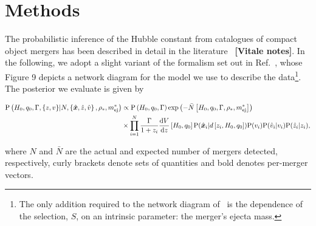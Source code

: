 \documentclass[%
 reprint,
 superscriptaddress,
 nofootinbib,
 amsmath,amssymb,
 aps,
]{revtex4-2}
\newcommand{\hubble}{\ensuremath{H_0}}
\newcommand{\decel}{\ensuremath{q_0}}
\newcommand{\prob}{\ensuremath{{\rm P}}}
\newcommand{\nexp}{\bar{N}}
\newcommand{\snrmin}{\rho_*}
\newcommand{\mejmin}{m_{\rm ej}^*}
\newcommand{\dgw}{\hat{\bm{x}}}
\begin{document}

\section{Methods} \label{sec:methods}

The probabilistic inference of the Hubble constant from catalogues of compact object mergers has been described in detail in the literature~\cite{Schutz:1986,Dalal:2006,Nissanke_etal:2010,Taylor_etal:2012,Nissanke_etal:2013,Abbott_etal:2017a,Chen_etal:2018,Fishbach_etal:2018,Feeney_etal:2018,Mandel_etal:2018,Gray_etal:2019,Mortlock_etal:2019} {\bf [Vitale notes]}. In the following, we adopt a slight variant of the formalism set out in Ref.~\cite{Mortlock_etal:2019}, whose Figure 9 depicts a network diagram for the model we use to describe the data\footnote{The only addition required to the network diagram of~\cite{Mortlock_etal:2019} is the dependence of the selection, $S$, on an intrinsic parameter: the merger's ejecta mass.}. The posterior we evaluate is given by
\begin{widetext}
\begin{align}
\prob \left( \hubble, \decel, \Gamma, \{z, v\} | N, \left\{ \dgw, \hat{z}, \hat{v} \right\}, \snrmin, \mejmin \right) & \propto
\prob \left( \hubble, \decel, \Gamma \right) \exp \left( -\bar{N} \left[ \hubble, \decel, \Gamma, \snrmin, \mejmin \right] \right) \\
& \times \prod_{i = 1}^{N} \frac{\Gamma}{1 + z_i} \frac{{\rm d}V}{{\rm d}z} \left[ \hubble, \decel \right] \prob (\dgw_i | d \left[ z_i, \hubble, \decel \right]) \prob(v_i) \prob(\hat{v}_i | v_i) \prob(\hat{z}_i | z_i), \nonumber
\end{align}
\end{widetext}
%
%
where $N$ and $\nexp$ are the actual and expected number of mergers detected, respectively, curly brackets denote sets of quantities and bold denotes per-merger vectors.
\end{document}
